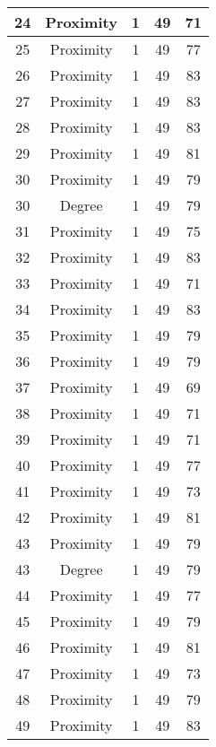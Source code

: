 \documentclass[results.tex]{subfiles}
\begin{document}
\begin{center}
\begin{tabular}{| c || c | c | c | c |}
    \hline
    24 & Proximity & 1 & 49 & 71 \\ 
    \hline
    25 & Proximity & 1 & 49 & 77 \\ 
    \hline
    26 & Proximity & 1 & 49 & 83 \\ 
    \hline
    27 & Proximity & 1 & 49 & 83 \\ 
    \hline
    28 & Proximity & 1 & 49 & 83 \\ 
    \hline
    29 & Proximity & 1 & 49 & 81 \\ 
    \hline
    30 & Proximity & 1 & 49 & 79 \\ 
    \hline
    30 & Degree & 1 & 49 & 79 \\ 
    \hline
    31 & Proximity & 1 & 49 & 75 \\ 
    \hline
    32 & Proximity & 1 & 49 & 83 \\ 
    \hline
    33 & Proximity & 1 & 49 & 71 \\ 
    \hline
    34 & Proximity & 1 & 49 & 83 \\ 
    \hline
    35 & Proximity & 1 & 49 & 79 \\ 
    \hline
    36 & Proximity & 1 & 49 & 79 \\ 
    \hline
    37 & Proximity & 1 & 49 & 69 \\ 
    \hline
    38 & Proximity & 1 & 49 & 71 \\ 
    \hline
    39 & Proximity & 1 & 49 & 71 \\ 
    \hline
    40 & Proximity & 1 & 49 & 77 \\ 
    \hline
    41 & Proximity & 1 & 49 & 73 \\ 
    \hline
    42 & Proximity & 1 & 49 & 81 \\ 
    \hline
    43 & Proximity & 1 & 49 & 79 \\ 
    \hline
    43 & Degree & 1 & 49 & 79 \\ 
    \hline
    44 & Proximity & 1 & 49 & 77 \\ 
    \hline
    45 & Proximity & 1 & 49 & 79 \\ 
    \hline
    46 & Proximity & 1 & 49 & 81 \\ 
    \hline
    47 & Proximity & 1 & 49 & 73 \\ 
    \hline
    48 & Proximity & 1 & 49 & 79 \\ 
    \hline
    49 & Proximity & 1 & 49 & 83 \\ 
    \hline   \end{tabular}
\end{center}
\end{document}
